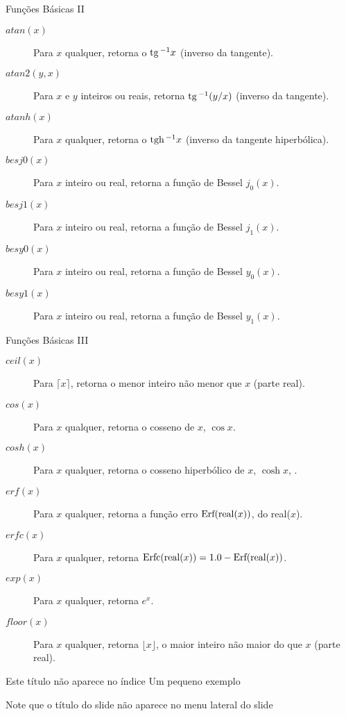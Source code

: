 \begin{slide}[toc=]{Funções Básicas II}
 
\begin{description}
\item[$atan(x)$] Para $x$ qualquer, retorna o $\hbox{\rm tg}\,^{-1} x$ (inverso da tangente).
\item[$atan2(y,x)$] Para $x$ e $y$ inteiros ou reais, retorna  $\hbox{\rm tg}\,^{-1}(y/x)$ (inverso da tangente).
\item[$atanh(x)$] Para $x$ qualquer, retorna o $\hbox{\rm tgh}\,^{-1} x$ (inverso da tangente hiperbólica).
\item[$besj0(x)$] Para $x$ inteiro ou real, retorna a função de Bessel $j_{0}(x)$.
\item[$besj1(x)$] Para $x$ inteiro ou real, retorna a função de Bessel $j_{1}(x)$.
\item[$besy0(x)$] Para $x$ inteiro ou real, retorna a função de Bessel $y_{0}(x)$.
\item[$besy1(x)$] Para $x$ inteiro ou real, retorna a função de Bessel $y_{1}(x)$.
\end{description}
\end{slide}

\begin{slide}[toc=]{Funções Básicas III}
 
\begin{description}
\item[$ceil(x)$] Para $\lceil x \rceil$, retorna o menor inteiro não menor que $x$ (parte real).
\item[$cos(x)$]  Para $x$ qualquer, retorna o cosseno de $x$, $\cos x$.
\item[$cosh(x)$] Para $x$ qualquer, retorna o cosseno hiperbólico de $x$, $\cosh x$, .
\item[$erf(x)$] Para $x$ qualquer, retorna a função erro $\hbox{Erf}(\hbox{real}(x))$, do real($x$).
\item[$erfc(x)$] Para $x$ qualquer, retorna $\hbox{Erfc}(\hbox{real}(x)) = 1.0 - \hbox{Erf}(\hbox{real}(x))$.
\item[$exp(x)$] Para $x$ qualquer, retorna $e^{x}$.
\item[$floor(x)$] Para $x$ qualquer, retorna $\lfloor x \rfloor$, o maior inteiro não maior do que $x$ (parte real).
\end{description}
\end{slide}
\begin{slide}[toc=]{Este título não aparece no índice}
Um pequeno exemplo

Note que o título do slide não aparece no menu lateral do slide
\end{slide}

